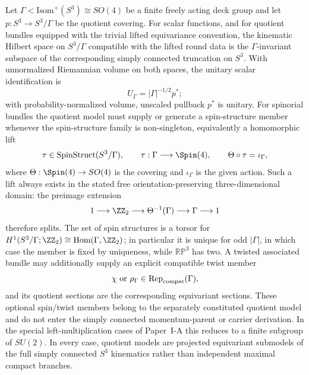 \documentclass[11pt,a4paper]{article}
\begin{document}
\begin{proposition}
\label{p2:prop:quotient-restriction}
Let \(\Gamma<\mathrm{Isom}^+(S^3)\cong SO(4)\) be a finite freely
acting deck group and let
\(p:S^3\to S^3/\Gamma\) be the quotient covering.  For scalar functions, and
for quotient bundles equipped with the trivial lifted equivariance convention,
the kinematic Hilbert space on \(S^3/\Gamma\) compatible with the lifted round
data is the \(\Gamma\)-invariant subspace of the corresponding simply
connected truncation on \(S^3\).  With unnormalized Riemannian volume on both
spaces, the unitary scalar identification is
\[
 U_\Gamma=|\Gamma|^{-1/2}p^*;
\]
with probability-normalized volume, unscaled pullback \(p^*\) is unitary.
For spinorial bundles the quotient model must supply or generate a
spin-structure member whenever the spin-structure family is non-singleton,
equivalently a homomorphic lift
\[
 \tau\in\operatorname{SpinStruct}(S^3/\Gamma),\qquad
 \tau:\Gamma\longrightarrow\Spin(4),
 \qquad
 \Theta\circ\tau=\iota_\Gamma,
\]
where \(\Theta:\Spin(4)\to SO(4)\) is the covering and
\(\iota_\Gamma\) is the given action.  Such a lift always exists in the
stated free orientation-preserving three-dimensional domain: the preimage
extension
\[
 1\longrightarrow\ZZ_2\longrightarrow
 \Theta^{-1}(\Gamma)\longrightarrow\Gamma\longrightarrow1
\]
therefore splits.  The set of spin structures is a torsor for
\(H^1(S^3/\Gamma;\ZZ_2)\cong\operatorname{Hom}(\Gamma,\ZZ_2)\); in
particular it is unique for odd \(|\Gamma|\), in which case the member is
fixed by uniqueness, while \(\mathbb{RP}^3\) has two.  A twisted associated
bundle may additionally supply an explicit compatible twist member
\[
 \chi\ \text{or}\ \rho_\Gamma\in
 \operatorname{Rep}_{\rm compat}(\Gamma),
\]
and its quotient sections are the corresponding equivariant sections.  These
optional spin/twist members belong to the separately constituted quotient
model and do not
enter the simply connected momentum-parent or carrier derivation.  In the
special left-multiplication cases of Paper~I-A this reduces to a finite subgroup
of \(SU(2)\).  In every case, quotient models are projected equivariant
submodels of the full simply connected \(S^3\) kinematics rather than
independent maximal compact branches.


\end{proposition}
\end{document}
